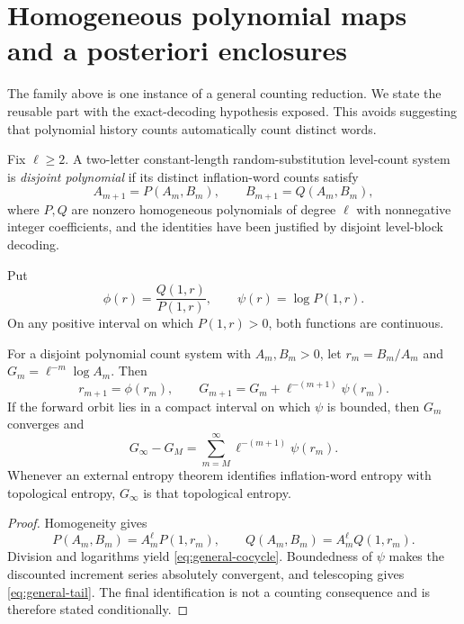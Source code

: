 \section{Homogeneous polynomial maps and a posteriori enclosures}
\label{sec:enclosures}

The family above is one instance of a general counting reduction.  We state
the reusable part with the exact-decoding hypothesis exposed.  This avoids
suggesting that polynomial history counts automatically count distinct
words.

\begin{definition}
Fix $\ell\ge2$.  A two-letter constant-length random-substitution level-count
system is \emph{disjoint polynomial} if its distinct inflation-word counts
satisfy
\begin{equation}
 A_{m+1}=P(A_m,B_m),\qquad B_{m+1}=Q(A_m,B_m),
 \label{eq:PQ-count}
\end{equation}
where $P,Q$ are nonzero homogeneous polynomials of degree $\ell$ with
nonnegative integer coefficients, and the identities have been justified by
disjoint level-block decoding.
\end{definition}

Put
\begin{equation}
 \phi(r)=\frac{Q(1,r)}{P(1,r)},\qquad
 \psi(r)=\log P(1,r).
 \label{eq:phi-psi}
\end{equation}
On any positive interval on which $P(1,r)>0$, both functions are continuous.

\begin{proposition}
\label{prop:general-cocycle}
For a disjoint polynomial count system with $A_m,B_m>0$, let
$r_m=B_m/A_m$ and $G_m=\ell^{-m}\log A_m$.  Then
\begin{equation}
 r_{m+1}=\phi(r_m),\qquad
 G_{m+1}=G_m+\ell^{-(m+1)}\psi(r_m).
 \label{eq:general-cocycle}
\end{equation}
If the forward orbit lies in a compact interval on which $\psi$ is bounded,
then $G_m$ converges and
\begin{equation}
 G_\infty-G_M=\sum_{m=M}^{\infty}\ell^{-(m+1)}\psi(r_m).
 \label{eq:general-tail}
\end{equation}
Whenever an external entropy theorem identifies inflation-word entropy with
topological entropy, $G_\infty$ is that topological entropy.
\end{proposition}

\begin{proof}
Homogeneity gives
\[
 P(A_m,B_m)=A_m^\ell P(1,r_m),\qquad
 Q(A_m,B_m)=A_m^\ell Q(1,r_m).
\]
Division and logarithms yield \cref{eq:general-cocycle}.  Boundedness of
$\psi$ makes the discounted increment series absolutely convergent, and
telescoping gives \cref{eq:general-tail}.  The final identification is not a
counting consequence and is therefore stated conditionally.
\end{proof}

